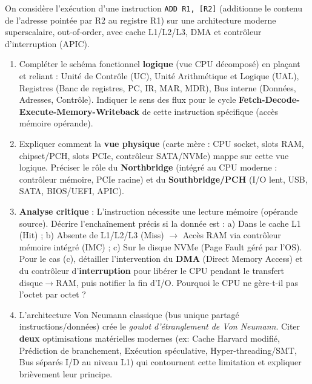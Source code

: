 \documentclass[11pt]{article}
\begin{document}
\begin{exercice}
On considère l'exécution d'une instruction \texttt{ADD R1, [R2]} (additionne le contenu de l'adresse pointée par R2 au registre R1) sur une architecture moderne superscalaire, out-of-order, avec cache L1/L2/L3, DMA et contrôleur d'interruption (APIC).
\begin{enumerate}
    \item Compléter le schéma fonctionnel \textbf{logique} (vue CPU décomposé) en plaçant et reliant : Unité de Contrôle (UC), Unité Arithmétique et Logique (UAL), Registres (Banc de registres, PC, IR, MAR, MDR), Bus interne (Données, Adresses, Contrôle). Indiquer le sens des flux pour le cycle \textbf{Fetch-Decode-Execute-Memory-Writeback} de cette instruction spécifique (accès mémoire opérande).
    \item Expliquer comment la \textbf{vue physique} (carte mère : CPU socket, slots RAM, chipset/PCH, slots PCIe, contrôleur SATA/NVMe) mappe sur cette vue logique. Préciser le rôle du \textbf{Northbridge} (intégré au CPU moderne : contrôleur mémoire, PCIe racine) et du \textbf{Southbridge/PCH} (I/O lent, USB, SATA, BIOS/UEFI, APIC).
    \item \textbf{Analyse critique} : L'instruction nécessite une lecture mémoire (opérande source). Décrire l'enchaînement précis si la donnée est : 
    a) Dans le cache L1 (Hit) ; 
    b) Absente de L1/L2/L3 (Miss) $\rightarrow$ Accès RAM via contrôleur mémoire intégré (IMC) ; 
    c) Sur le disque NVMe (Page Fault géré par l'OS). 
    Pour le cas (c), détailler l'intervention du \textbf{DMA} (Direct Memory Access) et du contrôleur d'\textbf{interruption} pour libérer le CPU pendant le transfert disque$\rightarrow$RAM, puis notifier la fin d'I/O. Pourquoi le CPU ne gère-t-il pas l'octet par octet ?
    \item L'architecture Von Neumann classique (bus unique partagé instructions/données) crée le \textit{goulot d'étranglement de Von Neumann}. Citer \textbf{deux} optimisations matérielles modernes (ex: Cache Harvard modifié, Prédiction de branchement, Exécution spéculative, Hyper-threading/SMT, Bus séparés I/D au niveau L1) qui contournent cette limitation et expliquer brièvement leur principe.
\end{enumerate}
\end{exercice}
\end{document}
